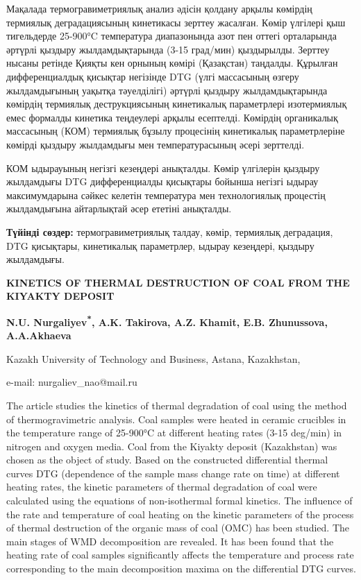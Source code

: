 \hspace{1.5em} Мақалада термогравиметриялық анализ әдісін қолдану арқылы көмірдің
термиялық деградациясының кинетикасы зерттеу жасалған. Көмір үлгілері
қыш тигельдерде 25-900°C температура диапазонында азот пен оттегі
орталарында әртүрлі қыздыру жылдамдықтарында (3-15 град/мин)
қыздырылды. Зерттеу нысаны ретінде Қияқты кен орнының көмірі (Қазақстан)
таңдалды. Құрылған дифференциалдық қисықтар негізінде DTG (үлгі
массасының өзгеру жылдамдығының уақытқа тәуелділігі) әртүрлі қыздыру
жылдамдықтарында көмірдің термиялық деструкциясының кинетикалық
параметрлері изотермиялық емес формалды кинетика теңдеулері арқылы
есептелді. Көмірдің органикалық массасының (КОМ) термиялық бұзылу
процесінің кинетикалық параметрлеріне көмірді қыздыру жылдамдығы мен
температурасының әсері зерттелді.

КОМ ыдырауының негізгі кезеңдері анықталды. Көмір үлгілерін қыздыру
жылдамдығы DTG дифференциалды қисықтары бойынша негізгі ыдырау
максимумдарына сәйкес келетін температура мен технологиялық процестің
жылдамдығына айтарлықтай әсер ететіні анықталды.

\hspace{1.5em} {\bfseries Түйінді сөздер:} термогравиметриялық талдау, көмір, термиялық
деградация, DTG қисықтары, кинетикалық параметрлер, ыдырау кезеңдері,
қыздыру жылдамдығы.

\begin{center}
{\large\bfseries KINETICS OF THERMAL DESTRUCTION OF COAL FROM THE KIYAKTY
DEPOSIT}

\vspace{1em}
{\bfseries N.U. Nurgaliyev\textsuperscript{*}, A.K. Takirova, A.Z. Khamit,
E.B. Zhunussova, A.A.Akhaeva}

Kazakh University of Technology and Business, Astana, Kazakhstan,

e-mail: nurgaliev\_nao@mail.ru
\end{center}

\hspace{1.5em} The article studies the kinetics of thermal degradation of coal using
the method of thermogravimetric analysis. Coal samples were heated in
ceramic crucibles in the temperature range of 25-900°C at different
heating rates (3-15 deg/min) in nitrogen and oxygen media. Coal from
the Kiyakty deposit (Kazakhstan) was chosen as the object of study.
Based on the constructed differential thermal curves DTG (dependence of
the sample mass change rate on time) at different heating rates, the
kinetic parameters of thermal degradation of coal were calculated using
the equations of non-isothermal formal kinetics. The influence of the
rate and temperature of coal heating on the kinetic parameters of the
process of thermal destruction of the organic mass of coal (OMC) has
been studied. The main stages of WMD decomposition are revealed. It has
been found that the heating rate of coal samples significantly affects
the temperature and process rate corresponding to the main decomposition
maxima on the differential DTG curves.

